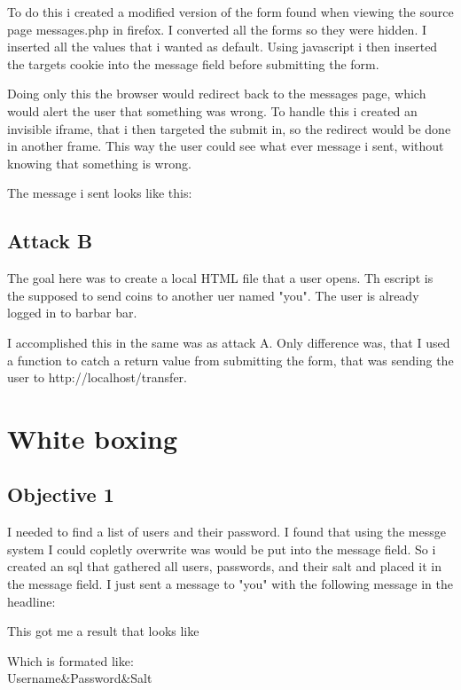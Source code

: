\documentclass{article}
\begin{document}
To do this i created a modified version of the form found when viewing the source page messages.php in firefox. I converted all the forms so they were hidden. I inserted all the values that i wanted as default. Using javascript i then inserted the targets cookie into the message field before submitting the form.

Doing only this the browser would redirect back to the messages page, which would alert the user that something was wrong. To handle this i created an invisible iframe, that i then targeted the submit in, so the redirect would be done in another frame. This way the user could see what ever message i sent, without knowing that something is wrong.

The message i sent looks like this:


\subsection{Attack B}
The goal here was to create a local HTML file that a user opens. Th escript is the supposed to send coins to another uer named "you". The user is already logged in to barbar bar.

I accomplished this in the same was as attack A. Only difference was, that I used a function to catch a return value from submitting the form, that was sending the user to http://localhost/transfer.




\section{White boxing}
\subsection{Objective 1}
I needed to find a list of users and their password. I found that using the messge system I could copletly overwrite was would be put into the message field. So i created an sql that gathered all users, passwords, and their salt and placed it in the message field. I just sent a message to "you" with the following message in the headline:


This got me a result that looks like 

Which is formated like:\\
Username\&Password\&Salt
\end{document}
